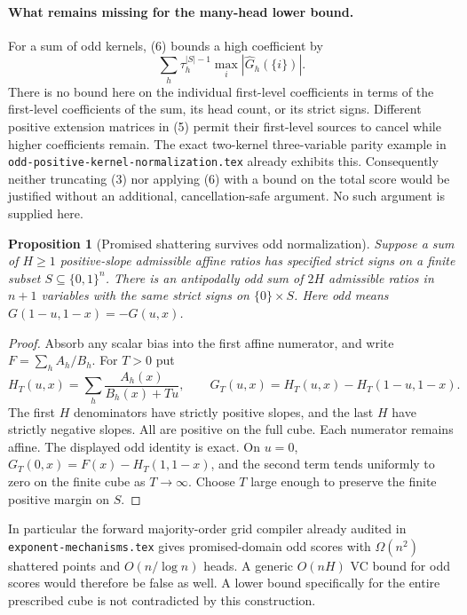 \documentclass[11pt]{article}
\newtheorem{proposition}{Proposition}
\begin{document}
\paragraph{What remains missing for the many-head lower bound.}
For a sum of odd kernels, (6) bounds a high coefficient by
\[
 \sum_h \tau_h^{|S|-1}\max_i|\widehat G_h(\{i\})|.
\]
There is no bound here on the individual first-level coefficients in
terms of the first-level coefficients of the sum, its head count,
or its strict signs. Different positive extension matrices in (5)
permit their first-level sources to cancel while higher coefficients
remain. The exact two-kernel three-variable parity example in
\texttt{odd-positive-kernel-normalization.tex} already exhibits this.
Consequently neither truncating (3) nor applying (6) with a bound
on the total score would be justified without an additional,
cancellation-safe argument. No such argument is supplied here.

\begin{proposition}[Promised shattering survives odd normalization]
Suppose a sum of $H\geq1$ positive-slope admissible affine ratios
has specified strict signs on a finite subset $S\subseteq\{0,1\}^n$.
There is an antipodally odd sum of $2H$ admissible ratios in $n+1$
variables with the same strict signs on $\{0\}\times S$.
Here odd means $G(1-u,1-x)=-G(u,x)$.
\end{proposition}
\begin{proof}
Absorb any scalar bias into the first affine numerator, and write
$F=\sum_h A_h/B_h$. For $T>0$ put
\[
 H_T(u,x)=\sum_h\frac{A_h(x)}{B_h(x)+Tu},\qquad
 G_T(u,x)=H_T(u,x)-H_T(1-u,1-x).
\]
The first $H$ denominators have strictly positive slopes, and the
last $H$ have strictly negative slopes. All are positive on the full
cube. Each numerator remains affine. The displayed odd identity is
exact. On $u=0$,
$G_T(0,x)=F(x)-H_T(1,1-x)$, and the second term tends uniformly to
zero on the finite cube as $T\to\infty$. Choose $T$ large enough to
preserve the finite positive margin on $S$.
\end{proof}

In particular the forward majority-order grid compiler already
audited in \texttt{exponent-mechanisms.tex} gives promised-domain odd
scores with $\Omega(n^2)$ shattered points and $O(n/\log n)$ heads.
A generic $O(nH)$ VC bound for odd scores would therefore be false
as well. A lower bound specifically for the entire prescribed cube
is not contradicted by this construction.
\end{document}
